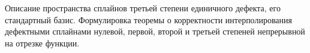 \documentclass[__main__.tex]{subfiles}
\begin{document}
Описание пространства сплайнов третьей степени единичного дефекта, его стандартный базис. Формулировка теоремы о корректности интерполирования дефектными сплайнами нулевой, первой, второй и третьей степеней непрерывной на отрезке функции.
\end{document}
